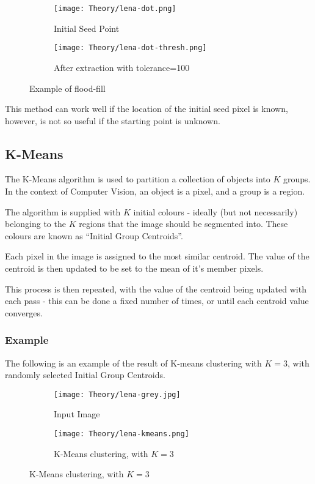 \begin{figure}[H]
    \centering
    \begin{subfigure}[b]{0.45\textwidth}
        \centering
        \texttt{[image: Theory/lena-dot.png]}
        \caption{Initial Seed Point}
    \end{subfigure}
    \begin{subfigure}[b]{0.45\textwidth}
        \centering
        \texttt{[image: Theory/lena-dot-thresh.png]}
        \caption{After extraction with tolerance=100}
    \end{subfigure}
    \caption{Example of flood-fill}
\end{figure}

This method can work well if the location of the initial seed pixel is known, however, is not so useful if the starting point is unknown.

\subsection{K-Means}
\label{sec:kmeans}
The K-Means algorithm is used to partition a collection of objects into $K$ groups. In the context of Computer Vision, an object is a pixel, and a group is a region.

The algorithm is supplied with $K$ initial colours - ideally (but not necessarily) belonging to the $K$ regions that the image should be segmented into. These colours are known as ``Initial Group Centroids''.

Each pixel in the image is assigned to the most similar centroid. The value of the centroid is then updated to be set to the mean of it's member pixels.

This process is then repeated, with the value of the centroid being updated with each pass - this can be done a fixed number of times, or until each centroid value converges.

\subsubsection{Example}
The following is an example of the result of K-means clustering with $K = 3$, with randomly selected Initial Group Centroids.

\begin{figure}[H]
    \centering
    \begin{subfigure}[b]{0.45\textwidth}
        \centering
        \texttt{[image: Theory/lena-grey.jpg]}
        \caption{Input Image}
    \end{subfigure}
    \begin{subfigure}[b]{0.45\textwidth}
        \centering
        \texttt{[image: Theory/lena-kmeans.png]}
        \caption{K-Means clustering, with $K = 3$}
    \end{subfigure}
\end{figure}

